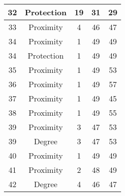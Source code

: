 \documentclass[results.tex]{subfiles}
\begin{document}
\begin{center}
\begin{tabular}{| c || c | c | c | c |}
            \hline
            32                      & Protection                   & 19                     & 31                      & 29                   \\
            \hline
            33                      & Proximity                    & 4                      & 46                      & 47                   \\
            \hline
            34                      & Proximity                    & 1                      & 49                      & 49                   \\
            \hline
            34                      & Protection                   & 1                      & 49                      & 49                   \\
            \hline
            35                      & Proximity                    & 1                      & 49                      & 53                   \\
            \hline
            36                      & Proximity                    & 1                      & 49                      & 57                   \\
            \hline
            37                      & Proximity                    & 1                      & 49                      & 45                   \\
            \hline
            38                      & Proximity                    & 1                      & 49                      & 55                   \\
            \hline
            39                      & Proximity                    & 3                      & 47                      & 53                   \\
            \hline
            39                      & Degree                       & 3                      & 47                      & 53                   \\
            \hline
            40                      & Proximity                    & 1                      & 49                      & 49                   \\
            \hline
            41                      & Proximity                    & 2                      & 48                      & 49                   \\
            \hline
            42                      & Degree                       & 4                      & 46                      & 47                   \\

\end{tabular}
\end{center}
\end{document}
